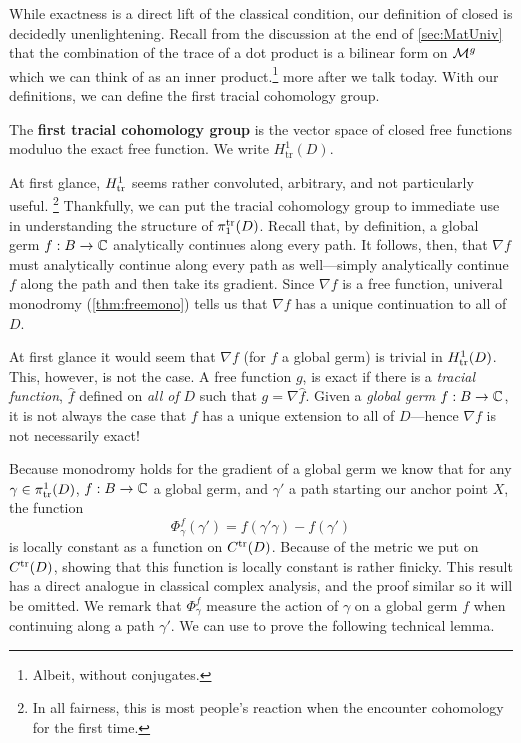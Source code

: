 While exactness is a direct lift of the classical condition, our definition of
closed is decidedly unenlightening. Recall from the discussion at the end of
\cref{sec:MatUniv} that the combination of the trace of a dot product is a
bilinear form on \(\mathcal{M}^{g} \) which we can think of as an inner
product.\footnote{Albeit, without conjugates.}
{\color{blue} more after we talk today.}
With our definitions, we can
define the first tracial cohomology group.

\begin{definition}%
\label{def:firsttrcohomo}
  The \textbf{first tracial cohomology group} is the vector space of closed free
  functions moduluo the exact free function. We write \(H^1_{\textrm{tr}}(D) \).
\end{definition}

At first glance, \(H^1_{\operatorname{tr}}\) seems rather convoluted, arbitrary, and not
particularly useful.
\footnote{In all fairness, this is most people's reaction when the encounter
  cohomology for the first time.}
Thankfully, we can put the tracial cohomology group to immediate use in
understanding the structure of \(\pi_1^{\operatorname{tr}}(D)\). Recall that, by definition, a
global germ \(f:B\to \mathbb{C} \) analytically continues along every path. It follows,
then, that \(\nabla f\) must analytically continue along every path as
well---simply analytically continue \(f\) along the path and then take its
gradient. Since \(\nabla f \) is a free function, univeral monodromy
(\cref{thm:freemono}) tells us that \(\nabla f\) has a unique continuation to
all of \(D\).

At first glance it would seem that \(\nabla f\) (for \(f\) a
global germ) is trivial in \(H_{\operatorname{tr}}^1(D)\). This, however, is not the case. A
free function \(g\), is exact if there is a \emph{tracial function}, \(\hat{f}\)
defined on \emph{all of } \(D\) such that \(g= \nabla \hat{f}\). Given a
\emph{global germ} \(f: B \to \mathbb{C} \), it is not always the case that \(f\) has a
unique extension to all of \(D\)---hence \(\nabla f \) is not necessarily exact!



Because monodromy holds for the gradient of a global germ we know that for any
\(\gamma \in \pi_{\operatorname{tr}}^1(D)\), \(f:B\to \mathbb{C} \) a global germ, and \(\gamma'\) a
path starting our anchor point \(X\), the function
\[
  \Phi_\gamma^f (\gamma')= f(\gamma'\gamma)-f(\gamma')
\]
is locally constant as a function on \(C^{\operatorname{tr}}(D)\). Because of the metric we
put on \(C^{\operatorname{tr}}(D)\), showing that this function
is locally constant is rather finicky. This result has a direct analogue in
classical complex analysis, and the proof similar so it will be omitted.
We remark that \(\Phi_\gamma^f\) measure the action of \(\gamma\) on a global
germ \(f\) when continuing along a path \(\gamma'\). We can use to prove the
following technical lemma.


